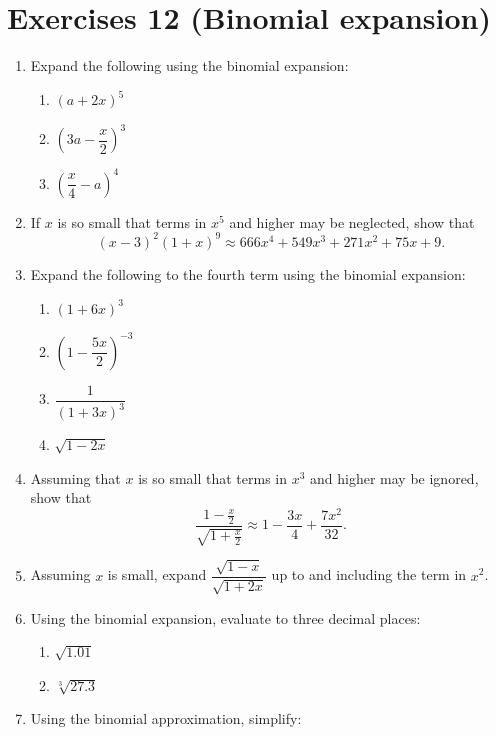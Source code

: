 \documentclass[
  12pt,
  oneside]{book}
\providecommand{\tightlist}{%
  \setlength{\itemsep}{0pt}\setlength{\parskip}{0pt}}
\theoremstyle{definition}
\theoremstyle{definition}
\theoremstyle{definition}
\theoremstyle{definition}
\theoremstyle{remark}
\begin{document}
\hypertarget{exercises-12-binomial-expansion}{%
\chapter*{Exercises 12 (Binomial expansion)}\label{exercises-12-binomial-expansion}}

\begin{enumerate}
\def\labelenumi{\arabic{enumi}.}
\item
  Expand the following using the binomial expansion:

  \begin{enumerate}
  \def\labelenumii{\roman{enumii})}
  \tightlist
  \item
    \((a+2x)^5\)
  \item
    \(\left(3a-\dfrac{x}{2}\right)^3\)
  \item
    \(\left(\dfrac{x}{4}-a\right)^4\)
  \end{enumerate}
\item
  If \(x\) is so small that terms in \(x^5\) and higher may be neglected, show that
  \[(x - 3)^2(1 + x)^9 \approx 666x^4 + 549x^3 + 271x^2 + 75x + 9.\]
\item
  Expand the following to the fourth term using the binomial expansion:

  \begin{enumerate}
  \def\labelenumii{\roman{enumii})}
  \tightlist
  \item
    \((1+6x)^3\)
  \item
    \(\left(1-\dfrac{5x}{2}\right)^{-3}\)
  \item
    \(\dfrac{1}{(1+3x)^3}\)
  \item
    \(\sqrt{1-2x}\)
  \end{enumerate}
\item
  Assuming that \(x\) is so small that terms in \(x^3\) and higher may be ignored, show that
  \[\frac{1-\frac{x}{2}}{\sqrt{1+\frac{x}{2}}}\approx 1-\frac{3x}{4}+\frac{7x^2}{32}.\]
\item
  Assuming \(x\) is small, expand \(\dfrac{\sqrt{1-x}}{\sqrt{1+2x}}\) up to and including the term in \(x^2\).
\item
  Using the binomial expansion, evaluate to three decimal places:

  \begin{enumerate}
  \def\labelenumii{\roman{enumii})}
  \tightlist
  \item
    \(\sqrt{1.01}\)
  \item
    \(\sqrt[3]{27.3}\)
  \end{enumerate}
\item
  Using the binomial approximation, simplify:


\end{enumerate}
\end{document}
